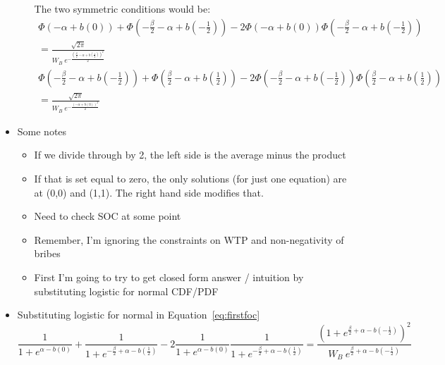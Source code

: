 \documentclass[12pt]{article}
\begin{document}
\begin{itemize}
\begin{itemize}
			The two symmetric conditions would be:
			\begin{multline}
					\Phi\left(- \alpha + b(0) \right)+  \Phi\left(-\frac{\beta}{2} - \alpha + b(-\frac{1}{2}) \right) 
					- 2 \Phi\left(- \alpha + b(0) \right)\Phi\left(-\frac{\beta}{2} - \alpha + b(-\frac{1}{2}) \right) \\ = \frac{\sqrt{2\pi}}{W_B \: e^{- \frac{\left(\frac{\beta}{2} - \alpha + b\left(\frac{1}{2}\right)\right)^2}{2}} }
				\end{multline}
			\begin{multline}
					\Phi\left(-\frac{\beta}{2} - \alpha + b(-\frac{1}{2}) \right)+  \Phi\left(\frac{\beta}{2} - \alpha + b(\frac{1}{2}) \right) 
					- 2 \Phi\left(-\frac{\beta}{2} - \alpha + b(-\frac{1}{2})\right)\Phi\left(\frac{\beta}{2} - \alpha + b(\frac{1}{2}) \right)\\ = \frac{\sqrt{2\pi}}{W_B \: e^{- \frac{\left( - \alpha + b\left(0\right)\right)^2}{2}} }
				\end{multline}
		\end{itemize}
	\item Some notes
		\begin{itemize}
			\item If we divide through by 2, the left side is the average minus the product
			\item If that is set equal to zero, the only solutions (for just one equation) are at (0,0) and (1,1). The right hand side modifies that.
			\item Need to check SOC at some point
			\item Remember, I'm ignoring the constraints on WTP and non-negativity of bribes
			\item First I'm going to try to get closed form answer / intuition by substituting logistic for normal CDF/PDF
		\end{itemize}
	\item Substituting logistic for normal in Equation~\ref{eq:firstfoc}
		\begin{equation}
					\frac{1}{1+e^{\alpha - b(0)}} + \frac{1}{1+e^{-\frac{\beta}{2} + \alpha - b\left(\frac{1}{2}\right) }}
					- 2\frac{1}{1+e^{\alpha - b(0)}}  \frac{1}{1+e^{-\frac{\beta}{2} + \alpha - b\left(\frac{1}{2}\right) }} = \frac{\left(1+e^{\frac{\beta}{2} + \alpha - b\left(-\frac{1}{2}\right)}\right)^2}{W_B \: e^{\frac{\beta}{2} + \alpha - b\left(-\frac{1}{2}\right)} }
					\label{eq:logistic}
				\end{equation}
		\begin{itemize}

\end{itemize}
\end{itemize}
\end{document}
